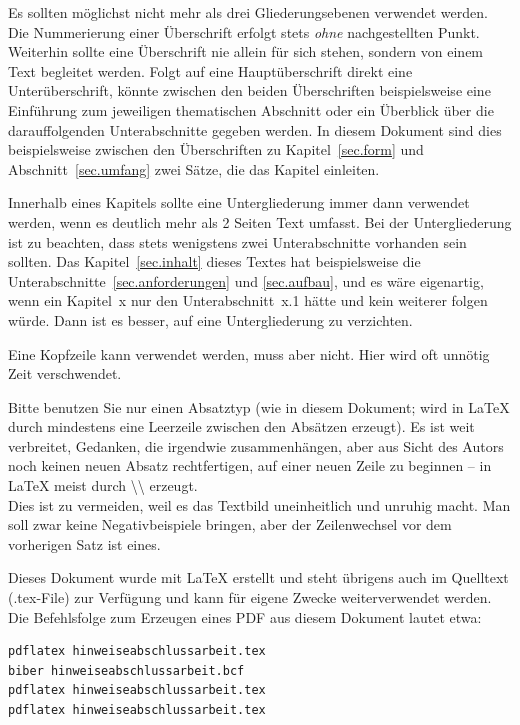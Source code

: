 \documentclass[
    fontsize=12pt,
    headings=small,
    parskip=half,           %
    bibliography=totoc,
    numbers=noenddot,       %
    open=any,               %
    ]{scrreprt}
\begin{document}
Es sollten möglichst nicht mehr als drei Gliederungsebenen verwendet werden. Die Nummerierung einer Überschrift erfolgt stets \emph{ohne} nachgestellten Punkt. Weiterhin sollte eine Überschrift nie allein für sich stehen, sondern von einem Text begleitet werden. Folgt auf eine Hauptüberschrift direkt eine Unterüberschrift, könnte zwischen den beiden Überschriften beispielsweise eine Einführung zum jeweiligen thematischen Abschnitt oder ein Überblick über die darauffolgenden Unterabschnitte gegeben werden. In diesem Dokument sind dies beispielsweise zwischen den Überschriften zu Kapitel~\ref{sec.form} und Abschnitt~\ref{sec.umfang} zwei Sätze, die das Kapitel einleiten.

Innerhalb eines Kapitels sollte eine Untergliederung immer dann verwendet werden, wenn es deutlich mehr als 2 Seiten Text umfasst. Bei der Untergliederung ist zu beachten, dass stets wenigstens zwei Unterabschnitte vorhanden sein sollten. Das Kapitel~\ref{sec.inhalt} dieses Textes hat beispielsweise die Unterabschnitte~\ref{sec.anforderungen} und \ref{sec.aufbau}, und es wäre eigenartig, wenn ein Kapitel~x nur den Unterabschnitt~x.1 hätte und kein weiterer folgen würde. Dann ist es besser, auf eine Untergliederung zu verzichten.  

Eine Kopfzeile kann verwendet werden, muss aber nicht. Hier wird oft unnötig Zeit verschwendet. 

Bitte benutzen Sie nur einen Absatztyp (wie in diesem Dokument; wird in LaTeX durch mindestens eine Leerzeile zwischen den Absätzen erzeugt). Es ist weit verbreitet, Gedanken, die irgendwie zusammenhängen, aber aus Sicht des Autors noch keinen neuen Absatz rechtfertigen, auf einer neuen Zeile zu beginnen -- in LaTeX meist durch {\textbackslash\textbackslash} erzeugt.\\ Dies ist zu vermeiden, weil es das Textbild uneinheitlich und unruhig macht. Man soll zwar keine Negativbeispiele bringen, aber der Zeilenwechsel vor dem vorherigen Satz ist eines.

Dieses Dokument wurde mit LaTeX erstellt und steht übrigens auch im Quelltext (.tex-File) zur Verfügung und kann für eigene Zwecke weiterverwendet werden. Die Befehlsfolge zum Erzeugen eines PDF aus diesem Dokument lautet etwa:

\begin{lstlisting}[numbers=none,xleftmargin=6pt]
pdflatex hinweiseabschlussarbeit.tex
biber hinweiseabschlussarbeit.bcf
pdflatex hinweiseabschlussarbeit.tex
pdflatex hinweiseabschlussarbeit.tex
\end{lstlisting}
\end{document}
